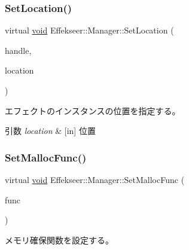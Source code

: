 \subsubsection{\texorpdfstring{Set\+Location()}{SetLocation()}\hspace{0.1cm}{\footnotesize\ttfamily [2/2]}}
{\footnotesize\ttfamily virtual \mbox{\hyperlink{namespace_effekseer_ab34c4088e512200cf4c2716f168deb56}{void}} Effekseer\+::\+Manager\+::\+Set\+Location (\begin{DoxyParamCaption}\item[{\mbox{\hyperlink{namespace_effekseer_afba58b8d812da862190e9bbfc040824a}{Handle}}}]{handle,  }\item[{const \mbox{\hyperlink{struct_effekseer_1_1_vector3_d}{Vector3D}} \&}]{location }\end{DoxyParamCaption})\hspace{0.3cm}{\ttfamily [pure virtual]}}



エフェクトのインスタンスの位置を指定する。 


\begin{DoxyParams}{引数}
{\em location} & \mbox{[}in\mbox{]} 位置 \\
\hline
\end{DoxyParams}
\mbox{\label{class_effekseer_1_1_manager_af1b85d9b77c7e923a399c3cc84a34fbc}} 
\subsubsection{\texorpdfstring{Set\+Malloc\+Func()}{SetMallocFunc()}}
{\footnotesize\ttfamily virtual \mbox{\hyperlink{namespace_effekseer_ab34c4088e512200cf4c2716f168deb56}{void}} Effekseer\+::\+Manager\+::\+Set\+Malloc\+Func (\begin{DoxyParamCaption}\item[{\mbox{\hyperlink{namespace_effekseer_a2f9a04a7b2d08a8f2173ce47e57ff742}{Malloc\+Func}}}]{func }\end{DoxyParamCaption})\hspace{0.3cm}{\ttfamily [pure virtual]}}



メモリ確保関数を設定する。 

\mbox{\label{class_effekseer_1_1_manager_a69d0768ed69c30d3993ececa6159c4dd}} 
